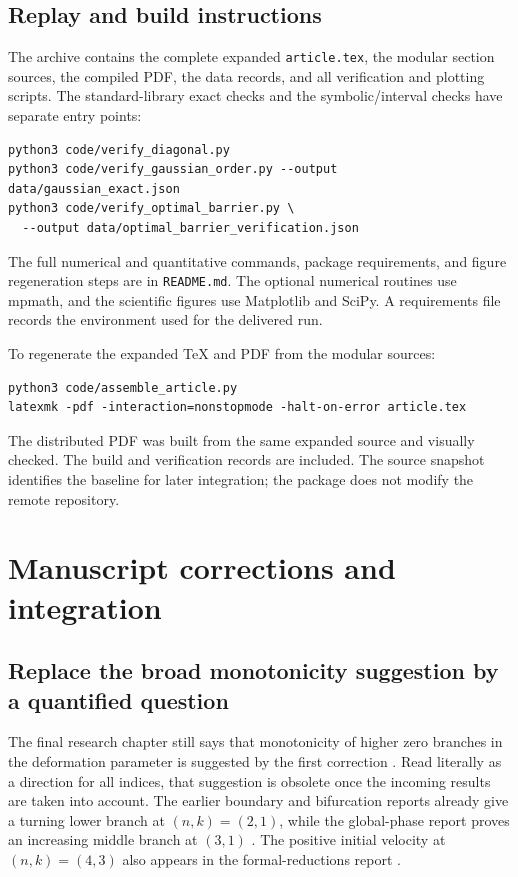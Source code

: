\documentclass[11pt,a4paper]{article}
\theoremstyle{definition}
\theoremstyle{remark}
\numberwithin{equation}{section}
\begin{document}
\subsection{Replay and build instructions}

The archive contains the complete expanded \nolinkurl{article.tex},
the modular section sources, the compiled PDF, the data records,
and all verification and plotting scripts.
The standard-library exact checks and the symbolic/interval checks
have separate entry points:
\begin{minipage}{\textwidth}
\begin{verbatim}
python3 code/verify_diagonal.py
python3 code/verify_gaussian_order.py --output data/gaussian_exact.json
python3 code/verify_optimal_barrier.py \
  --output data/optimal_barrier_verification.json
\end{verbatim}
\end{minipage}
The full numerical and quantitative commands, package requirements,
and figure regeneration steps are in \nolinkurl{README.md}.
The optional numerical routines use mpmath, and the scientific figures
use Matplotlib and SciPy. A requirements file records the environment
used for the delivered run.

To regenerate the expanded TeX and PDF from the modular sources:
\begin{verbatim}
python3 code/assemble_article.py
latexmk -pdf -interaction=nonstopmode -halt-on-error article.tex
\end{verbatim}
The distributed PDF was built from the same expanded source and
visually checked. The build and verification records are included.
The source snapshot identifies the baseline for later integration;
the package does not modify the remote repository.


\section{Manuscript corrections and integration}
\label{sec:corrections}

\subsection{Replace the broad monotonicity suggestion by a quantified question}

The final research chapter still says that monotonicity of higher zero
branches in the deformation parameter is suggested by the first
correction \cite{ProjectDiscovery}. Read literally as a direction for
all indices, that suggestion is obsolete once the incoming results are
taken into account. The earlier boundary and bifurcation reports already
give a turning lower branch at $(n,k)=(2,1)$, while the global-phase
report proves an increasing middle branch at $(3,1)$
\cite{IncomingBoundary,IncomingBifurcation,IncomingPhase}.
The positive initial velocity at $(n,k)=(4,3)$ also appears in the
formal-reductions report \cite{IncomingReductions}.
\end{document}
